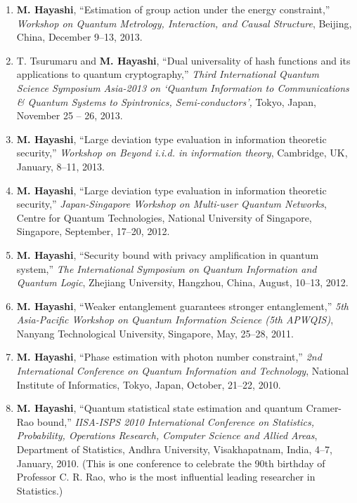 \documentclass[a4paper,12pt,oneside]{article}
\begin{document}
\begin{enumerate}
\item 
\textbf{M. Hayashi}, 
``Estimation of group action under the energy constraint,''
{\em Workshop on Quantum Metrology, Interaction, and Causal Structure},
Beijing, China, December 9--13, 2013. 

\item 
T. Tsurumaru and \textbf{M. Hayashi}, 
``Dual universality of hash functions and its applications to quantum
cryptography,''
{\em Third International Quantum Science Symposium Asia-2013
on `Quantum Information to Communications \& Quantum Systems to Spintronics, Semi-conductors',}
Tokyo, Japan, November 25 -- 26, 2013.

\item 
\textbf{M. Hayashi}, 
``Large deviation type evaluation in information theoretic security,''
{\em Workshop on Beyond i.i.d. in information theory},
Cambridge, UK, January, 8--11, 2013.

\item 
\textbf{M. Hayashi}, 
``Large deviation type evaluation in information theoretic security,'' 
{\em Japan-Singapore Workshop on Multi-user Quantum Networks}, 
Centre for Quantum Technologies, National University of Singapore, Singapore, September, 17--20, 2012.


\item 
\textbf{M. Hayashi}, 
``Security bound with privacy amplification in quantum system,'' 
{\em The International Symposium on Quantum Information and Quantum Logic}, 
Zhejiang University, Hangzhou, China, August, 10--13, 2012.


\item 
\textbf{M. Hayashi}, 
``Weaker entanglement guarantees stronger entanglement,'' 
{\em 5th Asia-Pacific Workshop on Quantum Information Science (5th APWQIS)}, 
Nanyang Technological University, Singapore, May, 25--28, 2011.

\item 
\textbf{M. Hayashi}, 
``Phase estimation with photon number constraint,'' 
{\em 2nd International Conference on Quantum Information and Technology}, 
National Institute of Informatics, Tokyo, Japan, October, 21--22, 2010.

\item 
\textbf{M. Hayashi}, 
``Quantum statistical state estimation and quantum Cramer-Rao bound,'' 
{\em IISA-ISPS 2010 International Conference on Statistics, Probability, Operations Research, Computer Science and Allied Areas}, 
Department of Statistics, Andhra University, Visakhapatnam, India, 4--7, January, 2010.
(This is one conference to celebrate the 90th birthday of Professor C. R. Rao,
who is the most influential leading researcher in Statistics.)


\end{enumerate}
\end{document}
